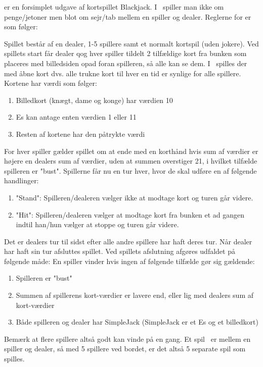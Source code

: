 \sbl er en forsimplet udgave af kortspillet Blackjack. I \sbl\ spiller man ikke om penge/jetoner men blot om sejr/tab mellem en spiller og dealer.  Reglerne for \sbl er som følger:

Spillet består af en dealer, 1-5 spillere samt et normalt kortspil (uden jokere). Ved spillets start får dealer qog hver spiller tildelt 2 tilfældige kort fra bunken som placeres med billedsiden opad foran spilleren, så alle kan se dem. I \sbl\ spilles der med åbne kort dvs. alle trukne kort til hver en tid er synlige for alle spillere.  Kortene har værdi som følger:
\begin{enumerate}
\item Billedkort (knægt, dame og konge) har værdien 10
\item Es kan antage enten værdien 1 eller 11
\item Resten af kortene har den påtrykte værdi
\end{enumerate}
For hver spiller gælder spillet om at ende med en korthånd hvis sum af værdier er højere en dealers sum af værdier,  uden at summen overstiger 21, i hvilket tilfælde spilleren er "bust". Spillerne får nu en tur hver, hvor de skal udføre en af følgende handlinger:
\begin{enumerate}
\item "Stand": Spilleren/dealeren vælger ikke at modtage kort og turen går videre.
\item "Hit": Spilleren/dealeren vælger at modtage kort fra bunken et ad gangen indtil han/hun vælger at stoppe og turen går videre.
\end{enumerate}
Det er dealers tur til sidst efter alle andre spillere har haft deres tur. Når dealer har haft sin tur afsluttes spillet. Ved spillets afslutning afgøres udfaldet på følgende måde: En spiller vinder hvis ingen af følgende tilfælde gør sig gældende:
\begin{enumerate}
\item Spilleren er "bust"
\item Summen af spillerens kort-værdier er lavere end, eller lig med dealers sum af kort-værdier
\item Både spilleren og dealer har SimpleJack (SimpleJack er et Es og et billedkort)
\end{enumerate}
Bemærk at flere spillere altså godt kan vinde på en gang. Et spil \sbl\ er mellem en spiller og dealer, 
så med 5 spillere ved bordet, er det altså 5 separate spil som spilles.

